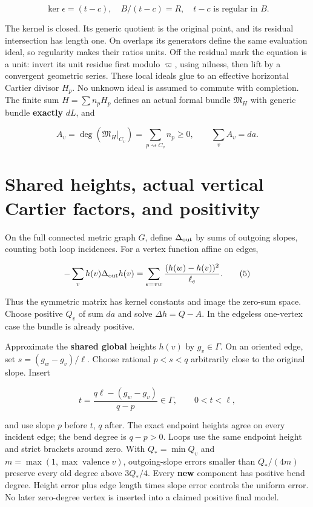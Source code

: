 \documentclass[
  11pt,
]{article}
\begin{document}
\[
 \ker\epsilon=(t-c),\quad B/(t-c)=R,
 \quad t-c\text{ is regular in }B.                                 \tag{3}
\]

The kernel is closed. Its generic quotient is the original point, and
its residual intersection has length one. On overlaps its generators
define the same evaluation ideal, so regularity makes their ratios
units. Off the residual mark the equation is a unit: invert its unit
residue first modulo \(\varpi\), using nilness, then lift by a
convergent geometric series. These local ideals glue to an effective
horizontal Cartier divisor \(H_p\). No unknown ideal is assumed to
commute with completion. The finite sum \(H=\sum n_pH_p\) defines an
actual formal bundle \(\mathfrak M_H\) with generic bundle
\textbf{exactly} \(dL\), and

\[
 A_v=\deg(\mathfrak M_H|_{C_v})
     =\sum_{p\rightsquigarrow C_v}n_p\geq0,
 \qquad\sum_v A_v=da.                                             \tag{4}
\]

\section{Shared heights, actual vertical Cartier factors, and
positivity}\label{shared-heights-actual-vertical-cartier-factors-and-positivity}

On the full connected metric graph \(G\), define \(\Delta_{\rm out}\) by
sums of outgoing slopes, counting both loop incidences. For a vertex
function affine on edges,

\[
 -\sum_vh(v)\Delta_{\rm out}h(v)
      =\sum_{e=vw}\frac{(h(w)-h(v))^2}{\ell_e}.                     \tag{5}
\]

Thus the symmetric matrix has kernel constants and image the zero-sum
space. Choose positive \(Q_v\) of sum \(da\) and solve \(\Delta h=Q-A\).
In the edgeless one-vertex case the bundle is already positive.

Approximate the \textbf{shared global} heights \(h(v)\) by
\(g_v\in\Gamma\). On an oriented edge, set \(s=(g_w-g_v)/\ell\). Choose
rational \(p<s<q\) arbitrarily close to the original slope. Insert

\[
 t=\frac{q\ell-(g_w-g_v)}{q-p}\in\Gamma,\qquad 0<t<\ell,           \tag{6}
\]

and use slope \(p\) before \(t\), \(q\) after. The exact endpoint
heights agree on every incident edge; the bend degree is \(q-p>0\).
Loops use the same endpoint height and strict brackets around zero. With
\(Q_* =\min Q_v\) and \(m=\max(1,\max\operatorname{valence}v)\),
outgoing-slope errors smaller than \(Q_*/(4m)\) preserve every old
degree above \(3Q_*/4\). Every \textbf{new} component has positive bend
degree. Height error plus edge length times slope error controls the
uniform error. No later zero-degree vertex is inserted into a claimed
positive final model.
\end{document}
